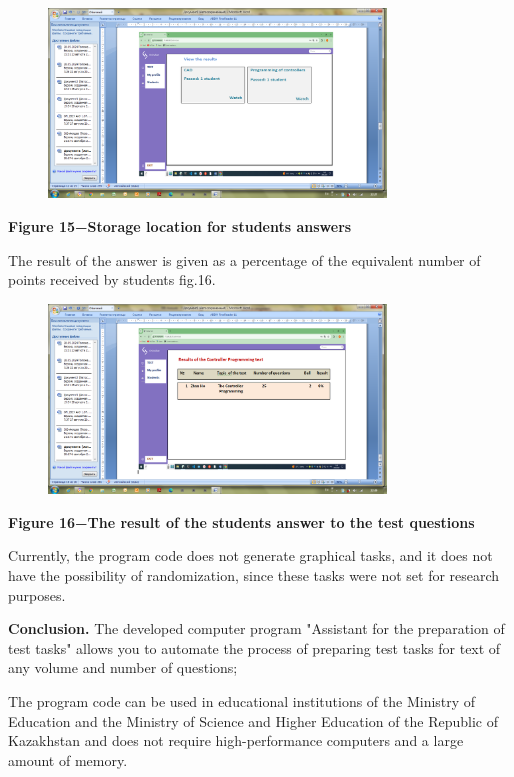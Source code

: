 \begin{figure}[H]
	\centering
	\includegraphics[width=0.8\textwidth]{assets/59}
	\caption*{}
\end{figure}

{\bfseries Figure 15−Storage location for students\textquotesingle{}
answers}

The result of the answer is given as a percentage of the equivalent
number of points received by students fig.16.

\begin{figure}[H]
	\centering
	\includegraphics[width=0.8\textwidth]{assets/60}
	\caption*{}
\end{figure}

{\bfseries Figure 16−The result of the student\textquotesingle s answer to
the test questions}

Currently, the program code does not generate graphical tasks, and it
does not have the possibility of randomization, since these tasks were
not set for research purposes.

{\bfseries Conclusion.} The developed computer program "Assistant for the
preparation of test tasks" allows you to automate the process of
preparing test tasks for text of any volume and number of questions;

The program code can be used in educational institutions of the Ministry
of Education and the Ministry of Science and Higher Education of the
Republic of Kazakhstan and does not require high-performance computers
and a large amount of memory.

